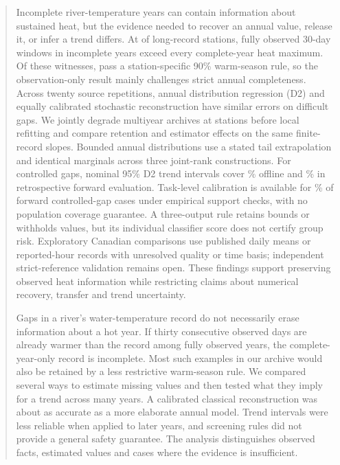 \documentclass[draft,linenumbers]{agujournal2025}
\begin{document}
\begin{abstract}
Incomplete river-temperature years can contain information about sustained heat, but the evidence needed to recover an annual value, release it, or infer a trend differs. At \RRecordStations{} of \RRecordDenominator{} long-record stations, fully observed 30-day windows in \RRecordStationYears{} incomplete years exceed every complete-year heat maximum. Of these witnesses, \WAWarmAdmitted{} pass a station-specific 90\% warm-season rule, so the observation-only result mainly challenges strict annual completeness. Across twenty source repetitions, annual distribution regression (D2) and equally calibrated stochastic reconstruction have similar errors on difficult gaps. We jointly degrade multiyear archives at \WAStations{} stations before local refitting and compare retention and estimator effects on the same finite-record slopes. Bounded annual distributions use a stated tail extrapolation and identical marginals across three joint-rank constructions. For controlled gaps, nominal 95\% D2 trend intervals cover \WAOfflineCoverage\% offline and \WAForwardCoverage\% in retrospective forward evaluation. Task-level calibration is available for \WATaskForwardPercent\% of forward controlled-gap cases under empirical support checks, with no population coverage guarantee. A three-output rule retains bounds or withholds values, but its individual classifier score does not certify group risk. Exploratory Canadian comparisons use published daily means or reported-hour records with unresolved quality or time basis; independent strict-reference validation remains open. These findings support preserving observed heat information while restricting claims about numerical recovery, transfer and trend uncertainty.
\begin{plainlanguagesummary}
Gaps in a river's water-temperature record do not necessarily erase information about a hot year. If thirty consecutive observed days are already warmer than the record among fully observed years, the complete-year-only record is incomplete. Most such examples in our archive would also be retained by a less restrictive warm-season rule. We compared several ways to estimate missing values and then tested what they imply for a trend across many years. A calibrated classical reconstruction was about as accurate as a more elaborate annual model. Trend intervals were less reliable when applied to later years, and screening rules did not provide a general safety guarantee. The analysis distinguishes observed facts, estimated values and cases where the evidence is insufficient.
\end{plainlanguagesummary}
\end{abstract}
\end{document}

